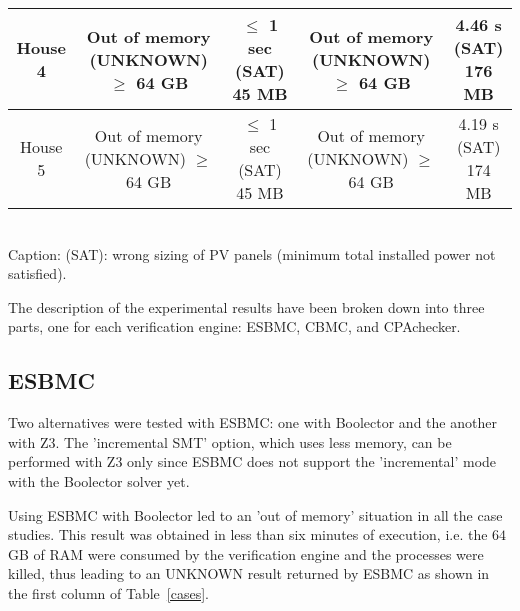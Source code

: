 \begin{table}
\begin{scriptsize}
\begin{tabular}{c|c|c|c|c}
\hline
House 4 &  \makecell{Out of memory \\(UNKNOWN)\\$\geq$ 64 GB} & \makecell{$\leq$ 1 sec \\(SAT)\\ 45 MB} & \makecell{Out of memory \\(UNKNOWN)\\$\geq$ 64 GB} & \makecell{4.46 s \\ (SAT)\\ 176 MB}\\
\hline
House 5 &  \makecell{Out of memory \\(UNKNOWN)\\$\geq$ 64 GB} & \makecell{$\leq$ 1 sec \\(SAT)\\ 45 MB} & \makecell{Out of memory \\(UNKNOWN)\\$\geq$ 64 GB} & \makecell{4.19 s \\ (SAT)\\ 174 MB}\\
\hline
\hline
\end{tabular}
\\Caption: (SAT): wrong sizing of PV panels (minimum total installed power not satisfied).
\end{scriptsize}
\end{table}

The description of the experimental results have been broken down into three parts, one for each verification engine: ESBMC, CBMC, and CPAchecker. 

\subsection{ESBMC}
\label{sec:ESBMCverification}

Two alternatives were tested with ESBMC: one with Boolector and the another with Z3. The 'incremental SMT' option, which uses less memory, can be performed with Z3 only since ESBMC does not support the 'incremental' mode with the Boolector solver yet. 

Using ESBMC with Boolector led to an 'out of memory' situation in all the case studies. This result was obtained in less than six minutes of execution, i.e. the $64$ GB of RAM were consumed by the verification engine and the processes were killed, thus leading to an UNKNOWN result returned by ESBMC as shown in the first column of Table~\ref{cases}. 

